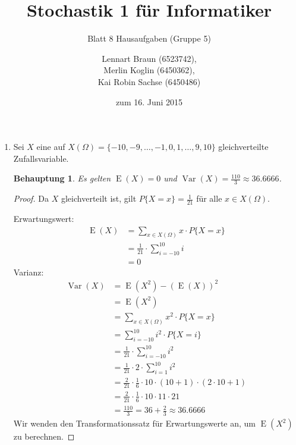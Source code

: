 \documentclass[a4paper]{scrartcl}
\title{Stochastik 1 für Informatiker}
\subtitle{Blatt 8 Hausaufgaben (Gruppe 5)}
\author{
    Lennart Braun (6523742), \\
    Merlin Koglin (6450362), \\
    Kai Robin Sachse (6450486)
}
\date{zum 16. Juni 2015}
\newtheorem*{behaupt}{Behauptung}
\newcommand{\e}{\operatorname{E}}
\newcommand{\var}{\operatorname{Var}}
\begin{document}
\maketitle

\begin{enumerate}[label=\bfseries\arabic*.]
    \item
        Sei $X$ eine auf
        $X(\Omega) = \{-10, -9, \ldots, -1, 0, 1, \ldots, 9, 10\}$
        gleichverteilte Zufallsvariable.
        \begin{behaupt}
            Es gelten $\e(X) = 0$ und
            $\var(X) = \frac{110}{3} \approx \num{36,6666}$.
        \end{behaupt}
        \begin{proof}
            Da $X$ gleichverteilt ist, gilt $P\{X = x\} = \frac{1}{21}$ für alle
            $x \in X(\Omega)$.

            Erwartungswert:
            \begin{equation*}
                \begin{split}
                    \e(X) &= \sum_{x \in X(\Omega)} x \cdot P\{X = x\} \\
                          &= \frac{1}{21} \cdot \sum_{i=-10}^{10} i \\
                          &= 0
                \end{split}
            \end{equation*}
            Varianz:
            \begin{equation*}
                \begin{split}
                    \var(X) &= \e(X^2) - (\e(X))^2 \\
                            &= \e(X^2) \\
                            &= \sum_{x \in X(\Omega)} x^2 \cdot P\{X = x\}  \\
                            &= \sum_{i=-10}^{10} i^2 \cdot P\{X = i\} \\
                            &= \frac{1}{21} \cdot \sum_{i=-10}^{10} i^2 \\
                            &= \frac{1}{21} \cdot 2 \cdot \sum_{i=1}^{10} i^2 \\
                            &= \frac{2}{21} \cdot \frac{1}{6} \cdot 10 \cdot
                               (10 + 1) \cdot (2 \cdot 10 + 1) \\
                            &= \frac{2}{21} \cdot \frac{1}{6} \cdot 10 \cdot 11
                               \cdot 21 \\
                            &= \frac{110}{3} = 36 + \frac{2}{3}
                               \approx \num{36,6666}
                \end{split}
            \end{equation*}
            Wir wenden den Transformationssatz für Erwartungswerte an, um
            $\e(X^2)$ zu berechnen.
        \end{proof}


\end{enumerate}
\end{document}
